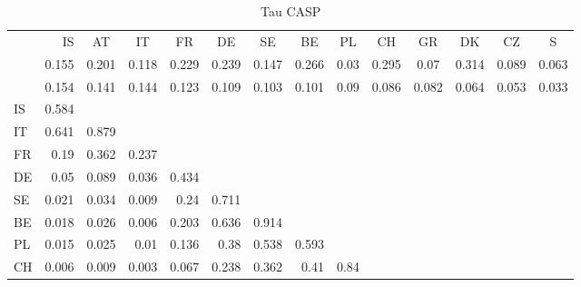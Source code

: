 \begin{table}[H]
  \centering
  \caption{Tau CASP}
    \begin{tabular}{lrrrrrrrrrrrrr}
          & \multicolumn{1}{p{4.785em}}{IS} & \multicolumn{1}{c}{AT} & \multicolumn{1}{c}{IT} & \multicolumn{1}{c}{FR} & \multicolumn{1}{c}{DE} & \multicolumn{1}{c}{SE} & \multicolumn{1}{c}{BE} & \multicolumn{1}{c}{PL} & \multicolumn{1}{c}{CH} & \multicolumn{1}{c}{GR} & \multicolumn{1}{c}{DK} & \multicolumn{1}{c}{CZ} & \multicolumn{1}{c}{S} \\
          & \multicolumn{1}{c}{0.155} & \multicolumn{1}{c}{0.201} & \multicolumn{1}{c}{0.118} & \multicolumn{1}{c}{0.229} & \multicolumn{1}{c}{0.239} & \multicolumn{1}{c}{0.147} & \multicolumn{1}{c}{0.266} & \multicolumn{1}{c}{0.03} & \multicolumn{1}{c}{0.295} & \multicolumn{1}{c}{0.07} & \multicolumn{1}{c}{0.314} & \multicolumn{1}{c}{0.089} & \multicolumn{1}{c}{0.063} \\
          & \multicolumn{1}{c}{0.154} & \multicolumn{1}{c}{0.141} & \multicolumn{1}{c}{0.144} & \multicolumn{1}{c}{0.123} & \multicolumn{1}{c}{0.109} & \multicolumn{1}{c}{0.103} & \multicolumn{1}{c}{0.101} & \multicolumn{1}{c}{0.09} & \multicolumn{1}{c}{0.086} & \multicolumn{1}{c}{0.082} & \multicolumn{1}{c}{0.064} & \multicolumn{1}{c}{0.053} & \multicolumn{1}{c}{0.033} \\
    IS    & 0.584 &       &       &       &       &       &       &       &       &       &       &       &  \\
    IT    & 0.641 & 0.879 &       &       &       &       &       &       &       &       &       &       &  \\
    FR    & 0.19  & 0.362 & 0.237 &       &       &       &       &       &       &       &       &       &  \\
    DE    & 0.05  & 0.089 & 0.036 & 0.434 &       &       &       &       &       &       &       &       &  \\
    SE    & 0.021 & 0.034 & 0.009 & 0.24  & 0.711 &       &       &       &       &       &       &       &  \\
    BE    & 0.018 & 0.026 & 0.006 & 0.203 & 0.636 & 0.914 &       &       &       &       &       &       &  \\
    PL    & 0.015 & 0.025 & 0.01  & 0.136 & 0.38  & 0.538 & 0.593 &       &       &       &       &       &  \\
    CH    & 0.006 & 0.009 & 0.003 & 0.067 & 0.238 & 0.362 & 0.41  & 0.84  &       &       &       &       &  \\

\end{tabular}
\end{table}
